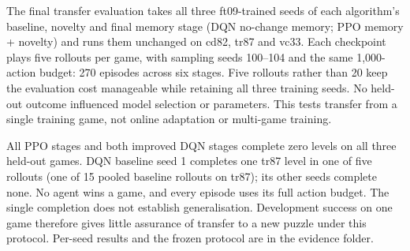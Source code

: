 The final transfer evaluation takes all three ft09-trained seeds of each
algorithm's baseline, novelty and final memory stage (DQN no-change memory;
PPO memory + novelty) and runs them unchanged on
cd82, tr87 and vc33. Each checkpoint plays five rollouts per game, with sampling
seeds 100--104 and the same 1,000-action budget: 270 episodes across six stages.
Five rollouts rather than 20 keep the evaluation cost manageable while retaining
all three training seeds. No held-out outcome influenced model selection or
parameters. This tests transfer from a single training game, not online
adaptation or multi-game training.

All PPO stages and both improved DQN stages complete zero levels on all three
held-out games. DQN baseline seed 1 completes one tr87 level in one of five
rollouts (one of 15 pooled baseline rollouts on tr87); its other seeds complete
none. No agent wins a game, and every episode uses its full action budget. The
single completion does not establish generalisation. Development success on one
game therefore gives little assurance of transfer to a new puzzle under this
protocol. Per-seed results and the frozen protocol are in the evidence folder.
